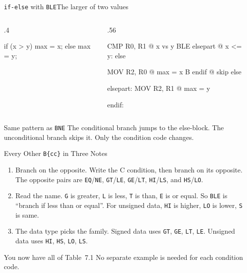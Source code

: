 \documentclass[9pt,aspectratio=169,xcolor=table]{beamer}
\begin{document}
{\beamerextras
\begin{frame}[fragile]{\texttt{if-else} with \texttt{BLE}}{The larger of two values}
    \begin{columns}[T]
    \begin{column}{.4\textwidth}
        \begin{cc}[basicstyle=\footnotesize\ttfamily]
if (x > y)
    max = x;
else
    max = y;
\end{cc}
    \end{column}
    \begin{column}{.56\textwidth}
        \begin{asm}[basicstyle=\footnotesize\ttfamily]
    CMP   R0, R1    @ x vs y
    BLE   elsepart  @ x <= y: else

    MOV   R2, R0    @ max = x
    B     endif     @ skip else

elsepart:
    MOV   R2, R1    @ max = y

endif:
\end{asm}
    \end{column}
    \end{columns}

    \vspace{2mm}
    \begin{block}{Same pattern as \texttt{BNE}}
        The conditional branch jumps to the else-block. The
        unconditional branch skips it. Only the condition code changes.
    \end{block}
\end{frame}
}

{\beamerextras
\begin{frame}{Every Other \texttt{B\{cc\}} in Three Notes}
    \begin{enumerate}\itemsep3mm
        \item \alert{Branch on the opposite.} Write the C condition,
              then branch on its opposite. The opposite pairs are
              \texttt{EQ}/\texttt{NE}, \texttt{GT}/\texttt{LE},
              \texttt{GE}/\texttt{LT}, \texttt{HI}/\texttt{LS}, and
              \texttt{HS}/\texttt{LO}.
        \item \alert{Read the name.} \texttt{G} is greater, \texttt{L} is
              less, \texttt{T} is than, \texttt{E} is or equal. So
              \texttt{BLE} is ``branch if less than or equal''. For
              unsigned data, \texttt{HI} is higher, \texttt{LO} is lower,
              \texttt{S} is same.
        \item \alert{The data type picks the family.} Signed data uses
              \texttt{GT}, \texttt{GE}, \texttt{LT}, \texttt{LE}.
              Unsigned data uses \texttt{HI}, \texttt{HS}, \texttt{LO},
              \texttt{LS}.
    \end{enumerate}
    \vspace{3mm}
    \begin{block}{You now have all of Table~7.1}
        No separate example is needed for each condition code.
    \end{block}
\end{frame}
}
\end{document}
